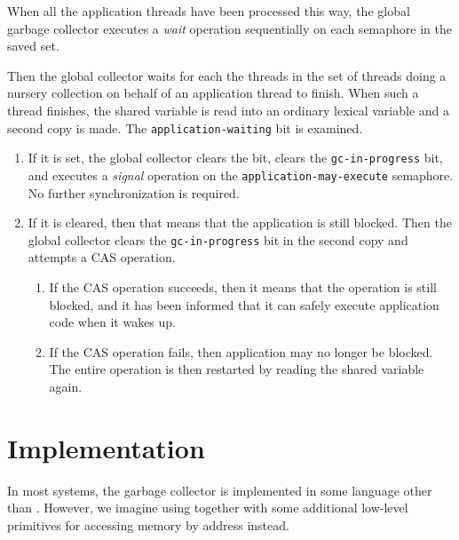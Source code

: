 When all the application threads have been processed this way, the
global garbage collector executes a \emph{wait} operation sequentially
on each semaphore in the saved set.

Then the global collector waits for each the threads in the set of
threads doing a nursery collection on behalf of an application thread
to finish.  When such a thread finishes, the shared variable is read
into an ordinary lexical variable and a second copy is made.  The
\texttt{application-waiting} bit is examined.

\begin{enumerate}
\item If it is set, the global collector clears the bit, clears the
  \texttt{gc-in-progress} bit, and executes a \emph{signal} operation
  on the \texttt{application-may-execute} semaphore.  No further
  synchronization is required.
\item  If it is cleared, then that means that the application is still
  blocked.  Then the global collector clears the
  \texttt{gc-in-progress} bit in the second copy and attempts a CAS
  operation.
  \begin{enumerate}
  \item If the CAS operation succeeds, then it means that the
    operation is still blocked, and it has been informed that it can
    safely execute application code when it wakes up.
  \item If the CAS operation fails, then application may no longer be
    blocked.  The entire operation is then restarted by reading the
    shared variable again.
  \end{enumerate}
\end{enumerate}

\section{Implementation}

In most systems, the garbage collector is implemented in some language
other than \commonlisp{}.  However, we imagine using \commonlisp{}
together with some additional low-level primitives for accessing
memory by address instead.

